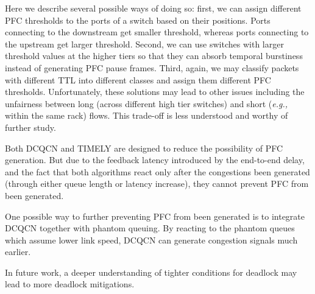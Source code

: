 Here we describe several possible ways of doing so: first, we can assign different PFC thresholds to 
the ports of a switch based on their positions. Ports connecting to the downstream get smaller threshold, 
whereas ports connecting to the upstream get larger threshold. 
Second, we can use switches with larger threshold values at the higher tiers so that they can absorb 
temporal burstiness instead of generating PFC pause frames. Third, again, we may classify 
packets with different TTL into different classes and assign them different PFC thresholds.
Unfortunately, these solutions may lead to other issues including the unfairness between long (across 
different high tier switches) and short ({\em e.g.,} within the same rack) flows. 
This trade-off is less understood and worthy of further study.




Both DCQCN and TIMELY are designed to reduce the possibility of PFC generation. But due to the feedback 
latency introduced by the end-to-end delay, and the fact that both algorithms react only after the 
congestions been generated (through either queue length or latency increase), they cannot prevent PFC 
from been generated. 

One possible way to further preventing PFC from been generated is to integrate DCQCN together with 
phantom queuing. By reacting to the phantom queues which assume lower link speed, DCQCN can generate 
congestion signals much earlier. 

In future work, a deeper understanding of tighter conditions for deadlock may
lead to more deadlock mitigations. 